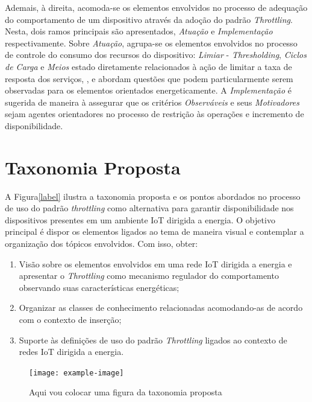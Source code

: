 Ademais, à direita, acomoda-se os elementos envolvidos no processo de adequação do comportamento de um dispositivo através da adoção do padrão \textit{Throttling}. Nesta, dois ramos principais são apresentados, \textit{Atuação} e \textit{Implementação} respectivamente. Sobre \textit{Atuação}, agrupa-se os elementos envolvidos no processo de controle do consumo dos recursos do dispositivo: \textit{Limiar} - \textit{Thresholding}, \textit{Ciclos de Carga} e \textit{Meios} estado diretamente relacionados à ação de limitar a taxa de resposta dos serviços,  \cite{khairnar_discrete-rate_2015}, \cite{khan_energy_2015} e \cite{sudevalayam_energy_2011} abordam questões que podem particularmente serem observadas para os elementos orientados energeticamente. A \textit{Implementação} é sugerida de maneira à assegurar que os critérios  \textit{Observáveis} e seus \textit{Motivadores} sejam agentes orientadores no processo de restrição às operações e incremento de disponibilidade. 


\section{Taxonomia Proposta}
A Figura\ref{label} ilustra a taxonomia proposta e os pontos abordados no processo de uso do padrão \textit{throttling} como alternativa para garantir disponibilidade nos dispositivos presentes em um ambiente  \acs{IoT} dirigida a energia. O objetivo principal é dispor os elementos ligados ao tema de maneira visual e contemplar a organização dos tópicos envolvidos. Com isso, obter:

\begin{enumerate}
    \item Visão sobre os elementos envolvidos em uma rede \acs{IoT} dirigida a energia e apresentar o \textit{Throttling} como mecanismo regulador do comportamento observando suas características energéticas;
    \item Organizar as classes de conhecimento relacionadas acomodando-as de acordo com o contexto de inserção;
    \item Suporte às definições de uso do padrão \textit{Throttling} ligados ao contexto de redes \acs{IoT} dirigida a energia. 
\end{enumerate}

\begin{figure}[h]
\noindent\texttt{[image: example-image]} 
\caption{Aqui vou colocar uma figura da taxonomia proposta}
\label{fig:taxonomia_detalhada}
\centering
\end{figure}

